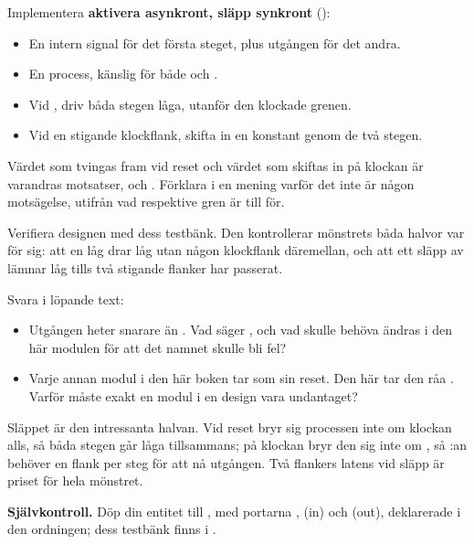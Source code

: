  Implementera \textbf{aktivera asynkront, släpp synkront} ():
\begin{itemize}
  \item En intern signal för det första steget, plus utgången för det andra.
  \item En process, känslig för både  och .
  \item Vid , driv båda stegen låga, utanför den klockade grenen.
  \item Vid en stigande klockflank, skifta in en konstant  genom de två stegen.
\end{itemize}

 Värdet som tvingas fram vid reset och värdet som skiftas in på klockan är varandras
motsatser,  och . Förklara i en mening varför det inte är någon motsägelse,
utifrån vad respektive gren är till för.

 Verifiera designen med dess testbänk. Den kontrollerar mönstrets båda halvor var för sig:
att en låg  drar  låg utan någon klockflank däremellan, och att ett
släpp av  lämnar  låg tills två stigande flanker har passerat.

 Svara i löpande text:
\begin{itemize}
  \item Utgången heter  snarare än . Vad säger , och
    vad skulle behöva ändras i den här modulen för att det namnet skulle bli fel?
  \item Varje annan modul i den här boken tar  som sin reset. Den här tar den råa
    . Varför måste exakt en modul i en design vara undantaget?
\end{itemize}

\note[Tips]Släppet är den intressanta halvan. Vid reset bryr sig processen inte om klockan alls, så
båda stegen går låga tillsammans; på klockan bryr den sig inte om , så :an
behöver en flank per steg för att nå utgången. Två flankers latens vid släpp är priset för hela
mönstret.


\begin{selfcheck}
\textbf{Självkontroll.} Döp din entitet till , med portarna ,
 (in) och  (out), deklarerade i den ordningen; dess testbänk finns i
.
\end{selfcheck}

